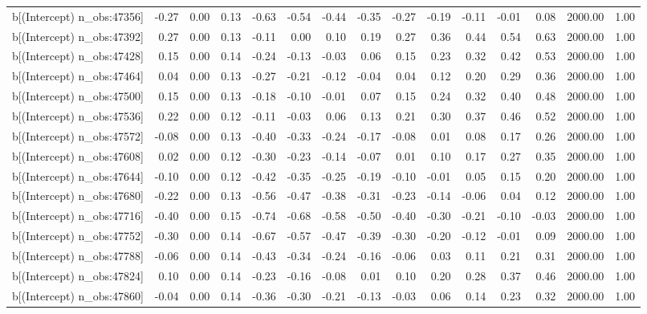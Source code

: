 \begin{table}[ht]
\begin{tabular}{rrrrrrrrrrrrrrr}
  b[(Intercept) n\_obs:47356] & -0.27 & 0.00 & 0.13 & -0.63 & -0.54 & -0.44 & -0.35 & -0.27 & -0.19 & -0.11 & -0.01 & 0.08 & 2000.00 & 1.00 \\ 
  b[(Intercept) n\_obs:47392] & 0.27 & 0.00 & 0.13 & -0.11 & 0.00 & 0.10 & 0.19 & 0.27 & 0.36 & 0.44 & 0.54 & 0.63 & 2000.00 & 1.00 \\ 
  b[(Intercept) n\_obs:47428] & 0.15 & 0.00 & 0.14 & -0.24 & -0.13 & -0.03 & 0.06 & 0.15 & 0.23 & 0.32 & 0.42 & 0.53 & 2000.00 & 1.00 \\ 
  b[(Intercept) n\_obs:47464] & 0.04 & 0.00 & 0.13 & -0.27 & -0.21 & -0.12 & -0.04 & 0.04 & 0.12 & 0.20 & 0.29 & 0.36 & 2000.00 & 1.00 \\ 
  b[(Intercept) n\_obs:47500] & 0.15 & 0.00 & 0.13 & -0.18 & -0.10 & -0.01 & 0.07 & 0.15 & 0.24 & 0.32 & 0.40 & 0.48 & 2000.00 & 1.00 \\ 
  b[(Intercept) n\_obs:47536] & 0.22 & 0.00 & 0.12 & -0.11 & -0.03 & 0.06 & 0.13 & 0.21 & 0.30 & 0.37 & 0.46 & 0.52 & 2000.00 & 1.00 \\ 
  b[(Intercept) n\_obs:47572] & -0.08 & 0.00 & 0.13 & -0.40 & -0.33 & -0.24 & -0.17 & -0.08 & 0.01 & 0.08 & 0.17 & 0.26 & 2000.00 & 1.00 \\ 
  b[(Intercept) n\_obs:47608] & 0.02 & 0.00 & 0.12 & -0.30 & -0.23 & -0.14 & -0.07 & 0.01 & 0.10 & 0.17 & 0.27 & 0.35 & 2000.00 & 1.00 \\ 
  b[(Intercept) n\_obs:47644] & -0.10 & 0.00 & 0.12 & -0.42 & -0.35 & -0.25 & -0.19 & -0.10 & -0.01 & 0.05 & 0.15 & 0.20 & 2000.00 & 1.00 \\ 
  b[(Intercept) n\_obs:47680] & -0.22 & 0.00 & 0.13 & -0.56 & -0.47 & -0.38 & -0.31 & -0.23 & -0.14 & -0.06 & 0.04 & 0.12 & 2000.00 & 1.00 \\ 
  b[(Intercept) n\_obs:47716] & -0.40 & 0.00 & 0.15 & -0.74 & -0.68 & -0.58 & -0.50 & -0.40 & -0.30 & -0.21 & -0.10 & -0.03 & 2000.00 & 1.00 \\ 
  b[(Intercept) n\_obs:47752] & -0.30 & 0.00 & 0.14 & -0.67 & -0.57 & -0.47 & -0.39 & -0.30 & -0.20 & -0.12 & -0.01 & 0.09 & 2000.00 & 1.00 \\ 
  b[(Intercept) n\_obs:47788] & -0.06 & 0.00 & 0.14 & -0.43 & -0.34 & -0.24 & -0.16 & -0.06 & 0.03 & 0.11 & 0.21 & 0.31 & 2000.00 & 1.00 \\ 
  b[(Intercept) n\_obs:47824] & 0.10 & 0.00 & 0.14 & -0.23 & -0.16 & -0.08 & 0.01 & 0.10 & 0.20 & 0.28 & 0.37 & 0.46 & 2000.00 & 1.00 \\ 
  b[(Intercept) n\_obs:47860] & -0.04 & 0.00 & 0.14 & -0.36 & -0.30 & -0.21 & -0.13 & -0.03 & 0.06 & 0.14 & 0.23 & 0.32 & 2000.00 & 1.00 \\ 

\end{tabular}
\end{table}
